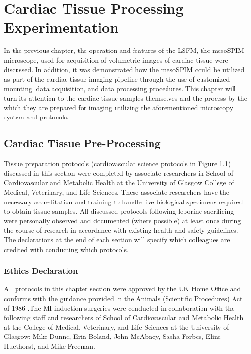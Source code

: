 \chapter{Cardiac Tissue Processing Experimentation}
In the previous chapter, the operation and features of the LSFM, the mesoSPIM microscope, used for acquisition of volumetric images of cardiac tissue were discussed. In addition, it was demonstrated how the mesoSPIM could be utilized as part of the cardiac tissue imaging pipeline through the use of customized mounting, data acquisition, and data processing procedures. This chapter will turn its attention to the cardiac tissue samples themselves and the process by the which they are prepared for imaging utilizing the aforementioned microscopy system and protocols.

\section{Cardiac Tissue Pre-Processing}
Tissue preparation protocols (cardiovascular science protocols in Figure 1.1) discussed in this section were completed by associate researchers in School of Cardiovascular and Metabolic Health at the University of Glasgow College of Medical, Veterinary, and Life Sciences. These associate researchers have the necessary accreditation and training to handle live biological specimens required to obtain tissue samples. All discussed protocols following leporine sacrificing were personally observed and documented (where possible) at least once during the course of research in accordance with existing health and safety guidelines. The declarations at the end of each section will specify which colleagues are credited with conducting which protocols. 

\subsection{Ethics Declaration}

All protocols in this chapter section were approved by the UK Home Office and conforms with the guidance provided in the Animals (Scientific Procedures) Act of 1986 \cite{freeman_novel_2024}.The MI induction surgeries were conducted in collaboration with the following staff and researchers of School of Cardiovascular and Metabolic Health at the College of Medical, Veterinary, and Life Sciences at the University of Glasgow: Mike Dunne, Erin Boland, John McAbney, Sasha Forbes, Eline Huethorst, and Mike Freeman.  

